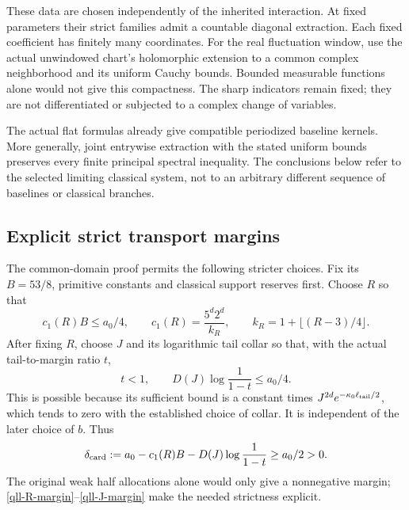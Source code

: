 \documentclass[11pt]{article}
\theoremstyle{remark}
\begin{document}
These data are chosen independently of the inherited interaction.
At fixed parameters their strict families admit a countable
diagonal extraction. Each fixed coefficient has finitely many
coordinates. For the real fluctuation window, use the actual
unwindowed chart's holomorphic extension to a common complex
neighborhood and its uniform Cauchy bounds. Bounded measurable
functions alone would not give this compactness. The sharp
indicators remain fixed; they are not differentiated or subjected
to a complex change of variables.

The actual flat formulas already give compatible periodized
baseline kernels. More generally, joint entrywise extraction
with the stated uniform bounds preserves every finite
principal spectral inequality. The conclusions below refer to
the selected limiting classical system, not to an arbitrary
different sequence of baselines or classical branches.

\subsection{Explicit strict transport margins}
\label{qll-margins-section}

The common-domain proof permits the following stricter choices.
Fix its \(B=53/8\), primitive constants and classical support
reserves first. Choose \(R\) so that
\begin{equation}
 c_1(R)B\le a_0/4,
 \qquad c_1(R)=\frac{5^d2^d}{k_R},
 \qquad k_R=1+\lfloor(R-3)/4\rfloor .
 \label{qll-R-margin}
\end{equation}
After fixing \(R\), choose \(J\) and its logarithmic tail
collar so that, with the actual tail-to-margin ratio \(t\),
\begin{equation}
 t<1,\qquad
 D(J)\log\frac1{1-t}\le a_0/4.
 \label{qll-J-margin}
\end{equation}
This is possible because its sufficient bound is a constant
times \(J^{2d}e^{-\kappa_0\ell_{\rm tail}/2}\), which tends
to zero with the established choice of collar. It is independent
of the later choice of \(b\). Thus
\begin{equation}
 \delta_{\rm card}
   :=a_0-c_1(R)B-D(J)\log\frac1{1-t}
   \ge a_0/2>0.
 \label{qll-card-margin}
\end{equation}
The original weak half allocations alone would only give a
nonnegative margin; \eqref{qll-R-margin}--\eqref{qll-J-margin}
make the needed strictness explicit.
\end{document}
